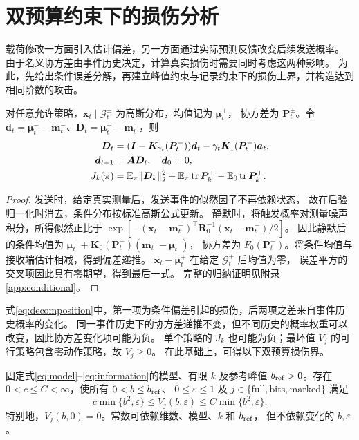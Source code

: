 \section{双预算约束下的损伤分析}
\label{sec:bounds}
载荷修改一方面引入估计偏差，另一方面通过实际预测反馈改变后续发送概率。
由于名义协方差由事件历史决定，计算真实损伤时需要同时考虑这两种影响。
为此，先给出条件误差分解，再建立峰值约束与记录约束下的损伤上界，并构造达到相同阶数的攻击。
\begin{lemma}[条件误差分解]
\label{lem:gaussian}
对任意允许策略，${\bm{x}}_t\mid\mathcal G_t^\pm$ 为高斯分布，均值记为 ${\bm{\mu}}_t^\pm$，
协方差为 ${\bm{P}}_t^\pm$。令 ${\bm{d}}_t={\bm{\mu}}_t^--{\bm{m}}_t^-$、${\bm{D}}_t={\bm{\mu}}_t^+-{\bm{m}}_t^+$，则
\begin{equation}
 \begin{aligned}
 {\bm{D}}_t&=({\bm{I}}-{\bm{K}}_{\gamma_t}({\bm{P}}_t^-)){\bm{d}}_t-\gamma_t {\bm{K}}_1({\bm{P}}_t^-){\bm{a}}_t,\\
 {\bm{d}}_{t+1}&={\bm{A}}{\bm{D}}_t,\quad {\bm{d}}_0=0,\\
 J_k(\pi)&=\mathbb E_\pi\|{\bm{D}}_k\|_2^2+
 \mathbb E_\pi\operatorname{tr}{\bm{P}}_k^+-\mathbb E_0\operatorname{tr}{\bm{P}}_k^+.
 \end{aligned}
 \label{eq:decomposition}
\end{equation}
\end{lemma}
\begin{proof}
发送时，给定真实测量后，发送事件的似然因子不再依赖状态，
故在后验归一化时消去，条件分布按标准高斯公式更新。
静默时，将触发概率对测量噪声积分，所得似然正比于
$\exp[-({\bm{x}}_t-{\bm{m}}_t^-)^\top {\bm{R}}_0^{-1}({\bm{x}}_t-{\bm{m}}_t^-)/2]$。
因此静默后的条件均值为 ${\bm{\mu}}_t^-+{\bm{K}}_0({\bm{P}}_t^-)({\bm{m}}_t^--{\bm{\mu}}_t^-)$，
协方差为 $F_0({\bm{P}}_t^-)$。将条件均值与接收端估计相减，得到偏差递推。
${\bm{x}}_t-{\bm{\mu}}_t^+$ 在给定 $\mathcal G_t^+$ 后均值为零，
误差平方的交叉项因此具有零期望，得到最后一式。
完整的归纳证明见附录\ref{app:conditional}。
\end{proof}

式\eqref{eq:decomposition}中，第一项为条件偏差引起的损伤，后两项之差来自事件历史概率的变化。
同一事件历史下的协方差递推不变，但不同历史的概率权重可以改变，因此协方差变化项可能为负。
单个策略的 $J_k$ 也可能为负；最坏值 $V_j$ 的可行策略包含零动作策略，故 $V_j\ge0$。
在此基础上，可得以下双预算损伤界。

\begin{theorem}[任意固定维数下的最坏损伤界]
\label{thm:main}
固定式\eqref{eq:model}--\eqref{eq:information}的模型、有限 $k$ 及参考峰值
$b_{\rm ref}>0$。存在 $0<c\le C<\infty$，使所有 $0<b\le b_{\rm ref}$、
$0\le\varepsilon\le1$ 及 $j\in\{\mathrm{full},\mathrm{bits},\mathrm{marked}\}$ 满足
\begin{equation}
 c\min\{b^2,\varepsilon\}\le V_j(b,\varepsilon)
 \le C\min\{b^2,\varepsilon\}.
 \label{eq:main}
\end{equation}
特别地，$V_j(b,0)=0$。常数可依赖维数、模型、$k$ 和 $b_{\rm ref}$，
但不依赖变化的 $b,\varepsilon$。
\end{theorem}

